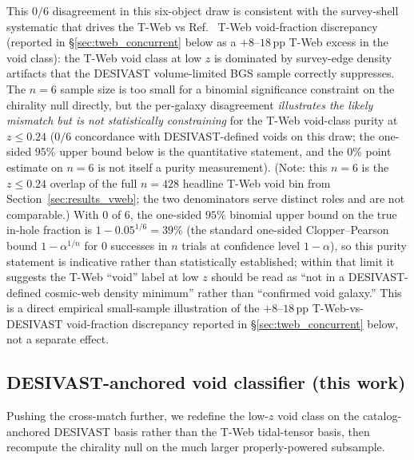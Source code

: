 \documentclass[aps,prd,twocolumn,superscriptaddress,showpacs,preprintnumbers,nofootinbib,longbibliography,floatfix]{revtex4-2}
\begin{document}
This $0/6$ disagreement in this six-object draw is consistent with the survey-shell systematic
that drives the T-Web vs Ref.~\cite{TWebDESI2026} T-Web void-fraction discrepancy
(reported in \S\ref{sec:tweb_concurrent} below as a
$+8$--$18\,$pp T-Web excess in the void class):
the T-Web void class at low $z$ is dominated by
survey-edge density artifacts that the DESIVAST volume-limited BGS
sample correctly suppresses. The $n = 6$ sample size is too small for
a binomial significance constraint on the chirality null directly, but
the per-galaxy disagreement \emph{illustrates the likely mismatch but is
not statistically constraining} for the T-Web void-class purity at
$z \leq 0.24$ ($0/6$ concordance with DESIVAST-defined voids on this
draw; the one-sided $95\%$ upper bound below is the quantitative
statement, and the $0\%$ point estimate on $n=6$ is not itself a purity
measurement). (Note: this $n=6$ is the $z \leq 0.24$ overlap of the full
$n=428$ headline T-Web void bin from
Section~\ref{sec:results_vweb}; the two denominators serve distinct
roles and are not comparable.) With $0$ of $6$, the one-sided $95\%$ binomial upper bound on
the true in-hole fraction is $1 - 0.05^{1/6} = 39\%$ (the standard
one-sided Clopper--Pearson bound $1 - \alpha^{1/n}$ for $0$ successes in
$n$ trials at confidence level $1-\alpha$), so this purity
statement is indicative rather than statistically established;
within that limit it suggests the T-Web ``void'' label at low $z$
should be read as ``not in a DESIVAST-defined cosmic-web density
minimum'' rather than ``confirmed void galaxy.''
This is a direct empirical small-sample illustration of the
$+8$--$18\,$pp T-Web-vs-DESIVAST void-fraction discrepancy
reported in \S\ref{sec:tweb_concurrent} below,
not a separate effect.

\subsection{DESIVAST-anchored void classifier (this work)}\label{sec:desivast_anchored_void}

Pushing the cross-match further, we redefine the low-$z$ void class on the
catalog-anchored DESIVAST basis rather than the T-Web tidal-tensor
basis, then recompute the chirality null on the much larger
properly-powered subsample.
\end{document}
